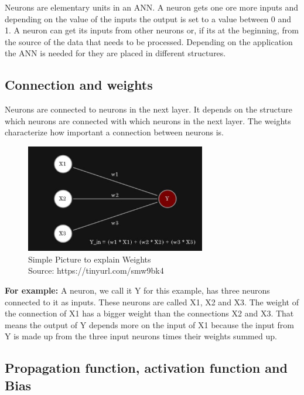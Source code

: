 Neurons are elementary units in an ANN. A neuron gets one ore more inputs and depending on the value of the inputs the output is set to a value between 0 and 1. A neuron can get its inputs from other neurons or, if its at the beginning, from the source of the data that needs to be processed. Depending on the application the ANN is needed for they are placed in different structures.


\subsection{Connection and weights}

Neurons are connected to neurons in the next layer. It depends on the structure which neurons are connected with which neurons in the next layer. The weights characterize how important a connection between neurons is. 

\begin{figure}[h]
	\centering
	\includegraphics[width=0.7\textwidth]{./media/images/weights1.jpg}
  	\caption{Simple Picture to explain  Weights
  	\\Source: https://tinyurl.com/smw9bk4}
  	\label{Gvon}
\end{figure}

\textbf{For example:}\newline
A neuron, we call it Y for this example, has three neurons connected to it as inputs. These neurons are called X1, X2 and X3. The weight of the connection of X1 has a bigger weight than the connections X2 and X3. That means the output of Y depends more on the input of X1 because the input from Y is made up from the three input neurons times their weights summed up.

\subsection{Propagation function, activation function and Bias}

